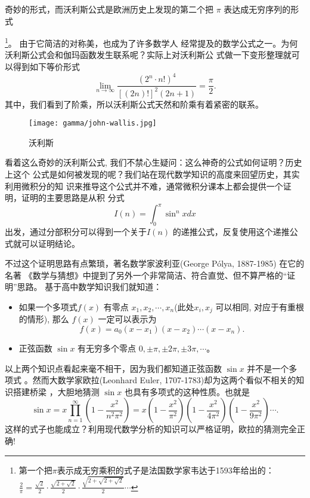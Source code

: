奇妙的形式，而沃利斯公式是欧洲历史上发现的第二个把 $\pi$ 表达成无穷序列的形式{
\footnote{第一个把$\pi$表示成无穷乘积的式子是法国数学家韦达于1593年给出的：
${\frac {2}{\pi }}={\frac {\sqrt {2}}{2}}\cdot {\frac {\sqrt {2+{\sqrt {2}}}}{2}}\cdot {\frac {\sqrt {2+{\sqrt {2+{\sqrt {2}}}}}}{2}}\cdots $
}。
由于它简洁的对称美，也成为了许多数学人
经常提及的数学公式之一。为何沃利斯公式会和伽玛函数发生联系呢？实际上对沃利斯公
式做一下变形整理就可以得到如下等价形式
$$ \lim_{n\rightarrow\infty} \frac{(2^n \cdot n!)^4}{[(2n)!]^2(2n+1)} = \frac{\pi}{2} .$$
其中，我们看到了阶乘，所以沃利斯公式天然和阶乘有着紧密的联系。

\begin{figure}[htbp]
\centering
\texttt{[image: gamma/john-wallis.jpg]}
\caption{沃利斯}
\end{figure}

看着这么奇妙的沃利斯公式, 我们不禁心生疑问：这么神奇的公式如何证明？历史上这个
公式是如何被发现的呢？我们站在现代数学知识的高度来回望历史，其实利用微积分的知
识来推导这个公式并不难，通常微积分课本上都会提供一个证明，证明的主要思路是从积
分式 $$ I(n) = \int_0^\pi \sin^nxdx $$ 出发，通过分部积分可以得到一个关于$I(n)$
的递推公式，反复使用这个递推公式就可以证明结论。 

不过这个证明思路有点繁琐，著名数学家波利亚(George P\'{o}lya, 1887-1985) 在它的名著
《数学与猜想》中提到了另外一个非常简洁、符合直觉、但不算严格的“证明”思路。
基于高中数学知识我们就知道：
\begin{itemize}
\item 如果一个多项式$f(x)$ 有零点 $x_1, x_2, \cdots,
x_n$(此处$x_i, x_j$ 可以相同, 对应于有重根的情形), 那么 $f(x)$ 一定可以表示为 
$$ f(x) = a_0 (x-x_1) (x-x_2) \cdots (x-x_n) .$$ 
\item 正弦函数 $\sin x$ 有无穷多个零点 $0, \pm\pi, \pm 2\pi, \pm 3\pi, \cdots $。 
\end{itemize}
以上两个知识点看起来毫不相干，因为我们都知道正弦函数 $\sin x$ 并不是一个多项式
。然而大数学家欧拉(Leonhard Euler, 1707-1783)却为这两个看似不相关的知识搭建桥梁
，大胆地猜测 $\sin x$ 也具有多项式的这种性质。也就是
\begin{equation}
\label{euler-sinx}
\sin x = x \prod_{n=1}^\infty\left(1 - \frac{x^2}{n^2\pi^2}\right) 
= x (1- \frac{x^2}{\pi^2})  (1- \frac{x^2}{4\pi^2})  (1- \frac{x^2}{9\pi^2}) \cdots .
\end{equation}
这样的式子也能成立？利用现代数学分析的知识可以严格证明，欧拉的猜测完全正确!  

}
